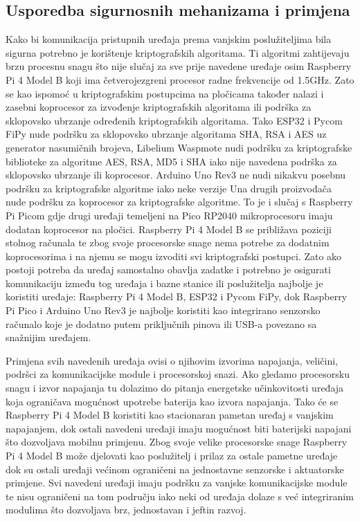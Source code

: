 \documentclass[times, utf8, diplomski]{fer}
\begin{document}
\subsection{Usporedba sigurnosnih mehanizama i primjena}
Kako bi komunikacija pristupnih uređaja prema vanjskim poslužiteljima bila sigurna potrebno je korištenje kriptografskih algoritama. Ti algoritmi zahtijevaju brzu procesnu snagu što nije slučaj za sve prije navedene uređaje osim Raspberry Pi 4 Model B koji ima četverojezgreni procesor radne frekvencije od 1.5GHz. Zato se kao ispomoć u kriptografskim postupcima na pločicama također nalazi i zasebni koprocesor za izvođenje kriptografskih algoritama ili podrška za sklopovsko ubrzanje određenih kriptografskih algoritama. Tako ESP32 i Pycom FiPy nude podršku za sklopovsko ubrzanje algoritama SHA, RSA i AES uz generator nasumičnih brojeva, Libelium Waspmote nudi podršku za kriptografske biblioteke za algoritme AES, RSA, MD5 i SHA iako nije navedena podrška za sklopovsko ubrzanje ili koprocesor. Arduino Uno Rev3 ne nudi nikakvu posebnu podršku za kriptografske algoritme iako neke verzije Una drugih proizvođača nude podršku za koprocesor za kriptografske algoritme. To je i slučaj s Raspberry Pi Picom gdje drugi uređaji temeljeni na Pico RP2040 mikroprocesoru imaju dodatan koprocesor na pločici. Raspberry Pi 4 Model B se približava poziciji stolnog računala te zbog svoje procesorske snage nema potrebe za dodatnim koprocesorima i na njemu se mogu izvoditi svi kriptografski postupci. Zato ako postoji potreba da uređaj samostalno obavlja zadatke i potrebno je osigurati komunikaciju između tog uređaja i bazne stanice ili poslužitelja najbolje je koristiti uređaje: Raspberry Pi 4 Model B, ESP32 i Pycom FiPy, dok Raspberry Pi Pico i Arduino Uno Rev3 je najbolje koristiti kao integrirano senzorsko računalo koje je dodatno putem priključnih pinova ili USB-a povezano sa snažnijim uređajem.

Primjena svih navedenih uređaja ovisi o njihovim izvorima napajanja, veličini, podršci za komunikacijske module i procesorskoj snazi. Ako gledamo procesorsku snagu i izvor napajanja tu dolazimo do pitanja energetske učinkovitosti uređaja koja ograničava mogućnost upotrebe baterija kao izvora napajanja. Tako će se Raspberry Pi 4 Model B koristiti kao stacionaran pametan uređaj s vanjskim napajanjem, dok ostali navedeni uređaji imaju mogućnost biti baterijski napajani što dozvoljava mobilnu primjenu. Zbog svoje velike procesorske snage Raspberry Pi 4 Model B može djelovati kao poslužitelj i prilaz za ostale pametne uređaje dok su ostali uređaji većinom ograničeni na jednostavne senzorske i aktuatorske primjene. Svi navedeni uređaji imaju podršku za vanjske komunikacijske module te nisu ograničeni na tom području iako neki od uređaja dolaze s već integriranim modulima što dozvoljava brz, jednostavan i jeftin razvoj.
\end{document}
